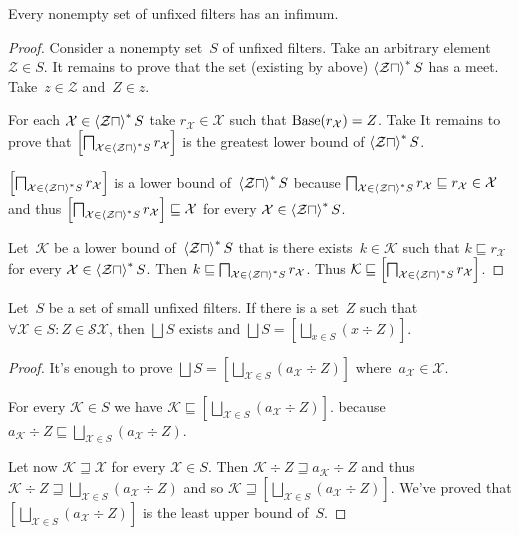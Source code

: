 \begin{thm}
Every nonempty set of unfixed filters has an infimum.
\end{thm}

\begin{proof}
Consider a nonempty set~$S$ of unfixed filters.
Take an arbitrary element $\mathcal{Z}\in S$. It remains
to prove that the set (existing by above)
$\left\langle \mathcal{Z}\sqcap\right\rangle ^{\ast}S$ has a meet.
Take~$z\in\mathcal{Z}$ and~$Z\in z$.

For each $\mathcal{X}\in\left\langle \mathcal{Z}\sqcap\right\rangle ^{\ast}S$ take
$r_{\mathcal{X}}\in\mathcal{X}$ such that
$\operatorname{Base}(r_{\mathcal{X}})=Z$. Take 
It remains to prove that
$\left[\bigsqcap_{\mathcal{X}\in\left\langle \mathcal{Z}\sqcap\right\rangle ^{\ast}S}r_{\mathcal{X}}\right]$ is the greatest lower bound of
$\left\langle \mathcal{Z}\sqcap\right\rangle ^{\ast}S$.

$\left[\bigsqcap_{\mathcal{X}\in\left\langle \mathcal{Z}\sqcap\right\rangle ^{\ast}S}r_{\mathcal{X}}\right]$ is a lower bound
of~$\left\langle \mathcal{Z}\sqcap\right\rangle ^{\ast}S$ because
$\bigsqcap_{\mathcal{X}\in\left\langle \mathcal{Z}\sqcap\right\rangle ^{\ast}S}r_{\mathcal{X}} \sqsubseteq r_{\mathcal{X}}\in\mathcal{X}$
and thus $\left[\bigsqcap_{\mathcal{X}\in\left\langle \mathcal{Z}\sqcap\right\rangle ^{\ast}S}r_{\mathcal{X}}\right]\sqsubseteq\mathcal{X}$
for every $\mathcal{X}\in\left\langle \mathcal{Z}\sqcap\right\rangle ^{\ast}S$.

Let~$\mathcal{K}$ be a lower bound
of~$\left\langle \mathcal{Z}\sqcap\right\rangle ^{\ast}S$ that is
there exists~$k\in\mathcal{K}$ such that
$k\sqsubseteq r_{\mathcal{X}}$
for every $\mathcal{X}\in\left\langle \mathcal{Z}\sqcap\right\rangle ^{\ast}S$.
Then $k\sqsubseteq\bigsqcap_{\mathcal{X}\in\left\langle \mathcal{Z}\sqcap\right\rangle ^{\ast}S}r_{\mathcal{X}}$.
Thus $\mathcal{K} \sqsubseteq \left[\bigsqcap_{\mathcal{X}\in\left\langle \mathcal{Z}\sqcap\right\rangle ^{\ast}S}r_{\mathcal{X}}\right]$.
\end{proof}

\begin{thm}
Let~$S$ be a set of small unfixed filters. If there is a
set~$Z$ such that
$\forall\mathcal{X}\in S:Z\in\mathscr{S}\mathcal{X}$, then
$\bigsqcup S$ exists and
$\bigsqcup S=\left[\bigsqcup_{x\in S}(x\div Z)\right]$.
\end{thm}

\begin{proof}
It's enough to prove $\bigsqcup S = \left[\bigsqcup_{\mathcal{X}\in S}(a_{\mathcal{X}}\div Z)\right]$ where~$a_{\mathcal{X}}\in\mathcal{X}$.

For every $\mathcal{K}\in S$ we have
$\mathcal{K} \sqsubseteq \left[\bigsqcup_{\mathcal{X}\in S}(a_{\mathcal{X}}\div Z)\right]$.
because 
$a_{\mathcal{K}}\div Z\sqsubseteq
\bigsqcup_{\mathcal{X}\in S}(a_{\mathcal{X}}\div Z)$.

Let now $\mathcal{K}\sqsupseteq\mathcal{X}$ for every
$\mathcal{X}\in S$. Then $\mathcal{K}\div Z\sqsupseteq
a_{\mathcal{K}}\div Z$ and thus
$\mathcal{K}\div Z\sqsupseteq
\bigsqcup_{\mathcal{X}\in S}(a_{\mathcal{X}}\div Z)$ and
so
$\mathcal{K} \sqsupseteq \left[\bigsqcup_{\mathcal{X}\in S}(a_{\mathcal{X}}\div Z)\right]$. We've proved that
$\left[\bigsqcup_{\mathcal{X}\in S}(a_{\mathcal{X}}\div Z)\right]$ is the least upper bound of~$S$.
\end{proof}

